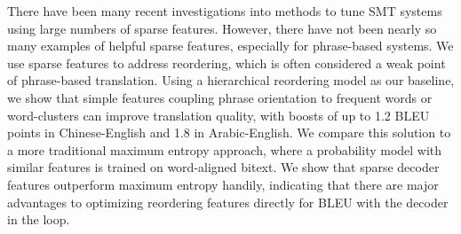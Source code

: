 There have been many recent investigations into methods to tune SMT systems using large numbers of sparse features. However, there have not been nearly so
 many examples of helpful sparse features, especially for phrase-based systems.
 We use sparse features to address reordering, which is often considered a weak
 point of phrase-based translation. Using a hierarchical reordering model as our
 baseline, we show that simple features coupling phrase orientation to frequent
 words or word-clusters can improve translation quality, with boosts of up to
 1.2 BLEU points in Chinese-English and 1.8 in Arabic-English. We compare this
 solution to a more traditional maximum entropy approach, where a probability
 model with similar features is trained on word-aligned bitext. We show that
 sparse decoder features outperform maximum entropy handily, indicating that
 there are major advantages to optimizing reordering features directly for BLEU
 with the decoder in the loop.

